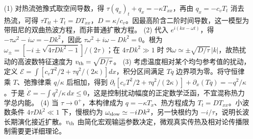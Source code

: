 (1) 对热流弛豫式取空间导数，得 \(\tau(q_x)_t+q_x=-\kappa T_{xx}\)，再由 \(q_x=-c_v T_t\) 消去热流，可得 \(\tau T_{tt}+T_t=D T_{xx}\)，\(D=\kappa/c_v\)。因最高阶含二阶时间导数，这一模型为带阻尼的双曲热波方程，而非普通扩散方程。
(2) 代入 \(e^{i(kx-\omega t)}\)，得 \(-\tau\omega^2-i\omega=-Dk^2\)，因此 \(\tau\omega^2+i\omega-Dk^2=0\)。根为 \(\omega_\pm=[-i\pm\sqrt{4\tau Dk^2-1}]/(2\tau)\)；在 \(4\tau Dk^2\gg1\) 时 \(\Re\omega\simeq\pm\sqrt{D/\tau}\,|k|\)，故热扰动的高波数特征速度为 \(v_{\rm th}=\sqrt{D/\tau}\)。
(3) 考虑温度相对某个均匀参考值的扰动，定义 \(\mathcal E=\int[c_vT^2/2+\tau q^2/(2\kappa)]dx\)，积分区间满足 \(Tq\) 边界项为零。将守恒律乘 \(T\)、弛豫律乘 \(q/\kappa\) 后相加，得到 \(\partial_t[c_vT^2/2+\tau q^2/(2\kappa)]+\partial_x(Tq)=-q^2/\kappa\)。于是 \(\dot{\mathcal E}=-\int q^2/\kappa\,dx\le0\)，这是控制扰动幅度的正定数学泛函，不宜混称热力学总内能。
(4) 当 \(\tau\to0^+\)，本构律成为 \(q=-\kappa T_x\)、热方程成为 \(T_t=D T_{xx}\)。小波数条件 \(4\tau Dk^2\ll1\) 下，慢根约为 \(\omega_{\rm slow}\simeq-iDk^2\)，另一快根约为 \(-i/\tau\)，说明长波长期演化接近扩散。\(v_{\rm th}\) 由简化宏观输运参数决定，微观真实传热及相对论传播限制需要更详细理论。
